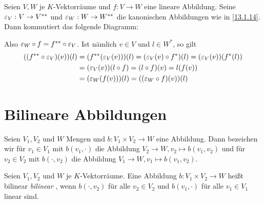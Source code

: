 \documentclass[../../main.tex]{subfiles}
\begin{document}
\begin{bem}\label{13.1.15}
Seien $V,W$ je $K$-Vektorräume und $f: V\to W$ eine lineare Abbildung. Seine $\varepsilon_V: V\to V^{**}$ und $\varepsilon_W: W\to W^{**}$ die kanonischen Abbildungen wie in \ref{13.1.14}. Dann kommutiert das folgende Diagramm:
\begin{center}
\end{center}
Also $\varepsilon_W\circ f= f^{**}\circ \varepsilon_V$. Ist nämlich $v \in V$ und $l\in W^*$, so gilt
\begin{align*}
((f^{**}\circ \varepsilon_V)(v))(l)&=(f^{**}(\varepsilon_V(v)))(l)=(\varepsilon_V(v)\circ f^*)(l)=(\varepsilon_V(v))(f^*(l))\\
&=(\varepsilon_V(v))(l\circ f)=(l\circ f)(v)=l(f(v))\\
&=(\varepsilon_W(f(v)))(l)=((\varepsilon_W\circ f)(v))(l)
\end{align*}
\end{bem}


\section{Bilineare Abbildungen}
\begin{df}\label{13.2.1}
Seien $V_1,V_2$ und $W$ Mengen und $b: V_1\times V_2\to W$ eine Abbildung. Dann bezeichen wir für $v_1\in V_1$ mit $b(v_1,\cdot)$ die Abbildung $V_2\to W, v_2\mapsto b(v_1,v_2)$ und für $v_2\in V_2$ mit $b(\cdot,v_2)$ die Abbildung $V_1\to W, v_1\mapsto b(v_1,v_2)$.
\end{df}	

\begin{df}\label{13.2.2}
Seien $V_1,V_2$ und $W$ je $K$-Vektorräume. Eine Abbildung $b: V_1\times V_2\to W$ heißt bilinear \emph{bilinear} , wenn $b(\cdot,v_2)$ für alle $v_2\in V_2$ und $b(v_1,\cdot)$ für alle $v_1\in V_1$ linear sind.
\end{df}
	
\end{document}
